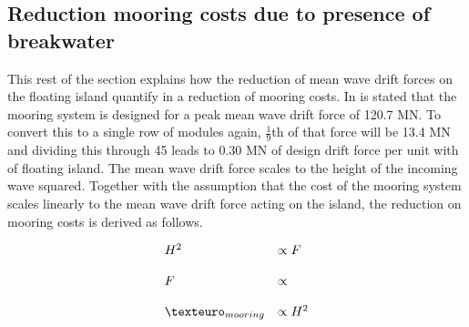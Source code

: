 \subsection{Reduction mooring costs due to presence of breakwater}
\label{subsec: reduction mooring costs function}
This rest of the section explains how the reduction of mean wave drift forces on the floating island quantify in a reduction of mooring costs. In \cite{D3.3space@sea} is stated that the mooring system is designed for a peak mean wave drift force of 120.7 MN. To convert this to a single row of modules again, $\frac{1}{9}$th of that force will be 13.4 MN and dividing this through 45 leads to 0.30 MN of design drift force per unit with of floating island. The mean wave drift force scales to the height of the incoming wave squared. Together with the assumption that the cost of the mooring system scales linearly to the mean wave drift force acting on the island, the reduction on mooring costs is derived as follows.


\begin{equation}
\begin{array}{lll}
    H^2 & \propto F\\
    \\
    F & \propto \\
    \\
    \texteuro_{mooring} & \propto H^2
\end{array}
\end{equation}




